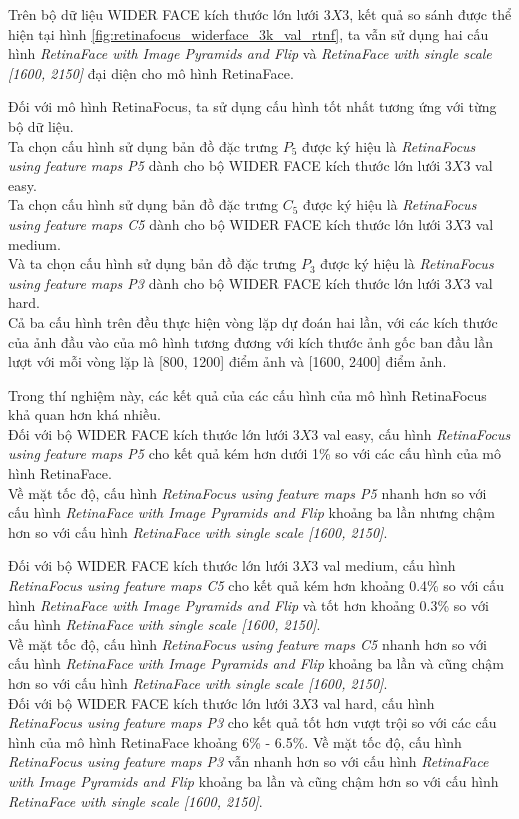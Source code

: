 {    \noindent
    Trên bộ dữ liệu WIDER FACE kích thước lớn lưới $3 X 3$, kết quả so sánh được thể hiện tại hình \ref{fig:retinafocus_widerface_3k_val_rtnf}, ta vẫn sử dụng hai cấu hình \textit{RetinaFace with Image Pyramids and Flip} và \textit{RetinaFace with single scale [1600, 2150]} đại diện cho mô hình RetinaFace.

    \noindent
    Đối với mô hình RetinaFocus, ta sử dụng cấu hình tốt nhất tương ứng với từng bộ dữ liệu. \\
    Ta chọn cấu hình sử dụng bản đồ đặc trưng $P_5$ được ký hiệu là \textit{RetinaFocus using feature maps P5} dành cho bộ WIDER FACE kích thước lớn lưới $3 X 3$ val easy. \\
    Ta chọn cấu hình sử dụng bản đồ đặc trưng $C_5$ được ký hiệu là \textit{RetinaFocus using feature maps C5} dành cho bộ WIDER FACE kích thước lớn lưới $3 X 3$ val medium. \\
    Và ta chọn cấu hình sử dụng bản đồ đặc trưng $P_3$ được ký hiệu là \textit{RetinaFocus using feature maps P3} dành cho bộ WIDER FACE kích thước lớn lưới $3 X 3$ val hard. \\
    Cả ba cấu hình trên đều thực hiện vòng lặp dự đoán hai lần, với các kích thước của ảnh đầu vào của mô hình tương đương với kích thước ảnh gốc ban đầu lần lượt với mỗi vòng lặp là [800, 1200] điểm ảnh và [1600, 2400] điểm ảnh.

    \noindent
    Trong thí nghiệm này, các kết quả của các cấu hình của mô hình RetinaFocus khả quan hơn khá nhiều. \\
    Đối với bộ WIDER FACE kích thước lớn lưới $3 X 3$ val easy, cấu hình \textit{RetinaFocus using feature maps P5} cho kết quả kém hơn dưới 1\% so với các cấu hình của mô hình RetinaFace. \\
    Về mặt tốc độ, cấu hình \textit{RetinaFocus using feature maps P5} nhanh hơn so với cấu hình \textit{RetinaFace with Image Pyramids and Flip} khoảng ba lần nhưng chậm hơn so với cấu hình \textit{RetinaFace with single scale [1600, 2150]}.

    \noindent
    Đối với bộ WIDER FACE kích thước lớn lưới $3 X 3$ val medium, cấu hình \textit{RetinaFocus using feature maps C5} cho kết quả kém hơn khoảng 0.4\% so với cấu hình \textit{RetinaFace with Image Pyramids and Flip} và tốt hơn khoảng 0.3\% so với cấu hình \textit{RetinaFace with single scale [1600, 2150]}. \\
    Về mặt tốc độ, cấu hình \textit{RetinaFocus using feature maps C5} nhanh hơn so với cấu hình \textit{RetinaFace with Image Pyramids and Flip} khoảng ba lần và cũng chậm hơn so với cấu hình \textit{RetinaFace with single scale [1600, 2150]}. \\
    Đối với bộ WIDER FACE kích thước lớn lưới $3 X 3$ val hard, cấu hình \textit{RetinaFocus using feature maps P3} cho kết quả tốt hơn vượt trội so với các cấu hình của mô hình RetinaFace khoảng 6\% - 6.5\%.
    Về mặt tốc độ, cấu hình \textit{RetinaFocus using feature maps P3} vẫn nhanh hơn so với cấu hình \textit{RetinaFace with Image Pyramids and Flip} khoảng ba lần và cũng chậm hơn so với cấu hình \textit{RetinaFace with single scale [1600, 2150]}.

}
